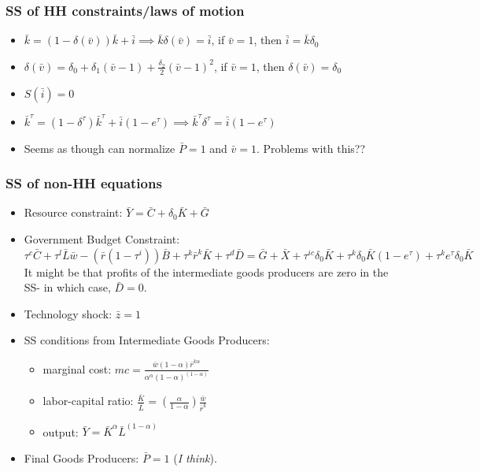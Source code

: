 \subsubsection{SS of HH constraints/laws of motion}
\begin{itemize}
\item $\bar{k}=(1-\delta(\bar{v}))\bar{k}+\bar{i}\implies \bar{k}\delta(\bar{v})=\bar{i}$, if $\bar{v}=1$, then $\bar{i}=\bar{k}\delta_{0}$
\item $\delta(\bar{v}) = \delta_{0}+\delta_{1}(\bar{v}-1)+\frac{\delta_{2}}{2}(\bar{v}-1)^{2}$, if $\bar{v}=1$, then $\delta(\bar{v})=\delta_{0}$
\item $S(\bar{i}) = 0$
\item $\bar{k}^{\tau} = (1-\delta^{\tau})\bar{k}^{\tau}+\bar{i}(1-e^{\tau}) \implies \bar{k}^{\tau}\delta^{\tau}=\bar{i}(1-e^{\tau})$
\item Seems as though can normalize $\bar{P}=1$ and $\bar{v}=1$.  Problems with this??
\end{itemize}


\subsubsection{SS of non-HH equations}

\begin{itemize}
\item Resource constraint: $\bar{Y} = \bar{C}+\delta_{0}\bar{K}+\bar{G}$
\item Government Budget Constraint: $\tau^{c}\bar{C} + \tau^{l}\bar{L}\bar{w} - (\bar{r}(1-\tau^{i}))\bar{B} + \tau^{k}\bar{r}^{k}\bar{K} + \tau^{d}\bar{D} = \bar{G} + \bar{X} + \tau^{ic}\delta_{0}\bar{K} + \tau^{k}\delta_{0}\bar{K}(1-e^{\tau}) + \tau^{k}e^{\tau}\delta_{0}\bar{K} $  It might be that profits of the intermediate goods producers are zero in the SS- in which case, $\bar{D}=0$.
\item Technology shock: $\bar{z} = 1$
\item SS conditions from Intermediate Goods Producers:
	\begin{itemize}
	\item marginal cost: $ mc = \frac{\bar{w}(1-\alpha)\bar{r}^{k \alpha}}{\alpha^{\alpha}(1-\alpha)^{(1-\alpha)}}$
	\item labor-capital ratio: $\frac{\bar{K}}{\bar{L}}=\left(\frac{\alpha}{1-\alpha}\right)\frac{\bar{w}}{\bar{r}^{k}}$
	\item output: $\bar{Y} = \bar{K}^{\alpha}\bar{L}^{(1-\alpha)}$
	\end{itemize}
	\item Final Goods Producers: $\bar{P}=1$ (\emph{I think}).
\end{itemize}




